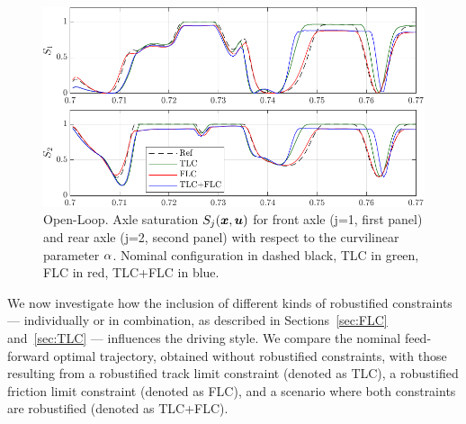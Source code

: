 \begin{figure}[t]
	\centering
	\includegraphics[scale = 1]{Fig/ol_saturation.pdf}
	\caption{Open-Loop. Axle saturation $S_j(\boldsymbol{x},\boldsymbol{u})$ for front axle (j=1, first panel) and rear axle (j=2, second panel) with respect to the curvilinear parameter $\alpha$. Nominal configuration in dashed black, TLC in green, FLC in red, TLC+FLC in blue.
	}
	\label{fig:ol_saturation}
\end{figure}

We now investigate how the inclusion of different kinds of robustified constraints --- individually or in combination, as described in Sections~\ref{sec:FLC} and~\ref{sec:TLC} --- influences the driving style.
We compare the nominal feed-forward optimal trajectory, obtained without robustified constraints, with those resulting from a robustified track limit constraint (denoted as TLC), a robustified friction limit constraint (denoted as FLC), and a scenario where both constraints are robustified (denoted as TLC+FLC).

